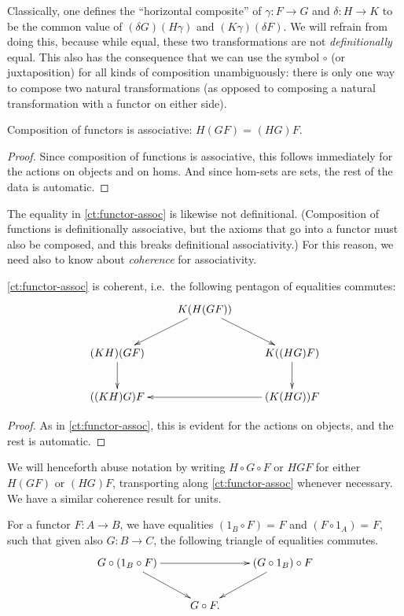 \documentclass{amsart}
\newcommand{\id}[3][]{\ensuremath{#2 =_{#1} #3}\xspace}
\theoremstyle{definition}
\theoremstyle{remark}
\numberwithin{equation}{section}
\begin{document}
Classically, one defines the ``horizontal composite'' of $\gamma:F\to G$ and $\delta:H\to K$ to be the common value of ${(\delta G)(H\gamma)}$ and ${(K\gamma)(\delta F)}$.
We will refrain from doing this, because while equal, these two transformations are not \emph{definitionally} equal.
This also has the consequence that we can use the symbol $\circ$ (or juxtaposition) for all kinds of composition unambiguously: there is only one way to compose two natural transformations (as opposed to composing a natural transformation with a functor on either side).

\begin{lem}\label{ct:functor-assoc}
  Composition of functors is associative: $\id{H(GF)}{(HG)F}$.
\end{lem}
\begin{proof}
  Since composition of functions is associative, this follows immediately for the actions on objects and on homs.
  And since hom-sets are sets, the rest of the data is automatic.
\end{proof}

The equality in \autoref{ct:functor-assoc} is likewise not definitional.
(Composition of functions is definitionally associative, but the axioms that go into a functor must also be composed, and this breaks definitional associativity.)  For this reason, we need also to know about \emph{coherence} for associativity.

\begin{lem}\label{ct:pentagon}
  \autoref{ct:functor-assoc} is coherent, i.e.\ the following pentagon of equalities commutes:
  \[ \xymatrix{ & K(H(GF)) \ar[dl] \ar[dr]\\
    (KH)(GF) \ar[d] && K((HG)F) \ar[d]\\
    ((KH)G)F && (K(HG))F \ar[ll] }
  \]
\end{lem}
\begin{proof}
  As in \autoref{ct:functor-assoc}, this is evident for the actions on objects, and the rest is automatic.
\end{proof}

We will henceforth abuse notation by writing $H\circ G\circ F$ or $HGF$ for either $H(GF)$ or $(HG)F$, transporting along \autoref{ct:functor-assoc} whenever necessary.
We have a similar coherence result for units.

\begin{lem}\label{ct:units}
  For a functor $F:A\to B$, we have equalities $\id{(1_B\circ F)}{F}$ and $\id{(F\circ 1_A)}{F}$, such that given also $G:B\to C$, the following triangle of equalities commutes.
  \[ \xymatrix{
    G\circ (1_B \circ F) \ar[rr] \ar[dr] &&
    (G\circ 1_B)\circ F \ar[dl] \\
    & G \circ F.}
  \]
\end{lem}
\end{document}
